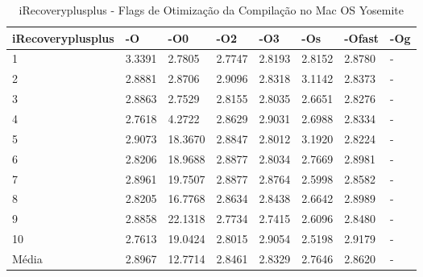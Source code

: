 \begin{table}[!ht]
\centering
\caption{iRecoveryplusplus - Flags de Otimização da Compilação no Mac OS Yosemite}
\label{tab:otimizacao_compilacao:mac:irecoveryplusplus}
\begin{tabular}{llllllll}
\textbf{iRecoveryplusplus} & \textbf{-O}  & \textbf{-O0}   & \textbf{-O2} & \textbf{-O3} & \textbf{-Os} & \textbf{-Ofast} & \textbf{-Og} \\ \toprule
1                          & 3.3391       &   2.7805       &  2.7747      &  2.8193      &  2.8152      &   2.8780        &  -           \\ 
2                          & 2.8881       &   2.8706       &  2.9096      &  2.8318      &  3.1142      &   2.8373        &  -           \\ 
3                          & 2.8863       &   2.7529       &  2.8155      &  2.8035      &  2.6651      &   2.8276        &  -           \\ 
4                          & 2.7618       &   4.2722       &  2.8629      &  2.9031      &  2.6988      &   2.8334        &  -           \\ 
5                          & 2.9073       &   18.3670      &  2.8847      &  2.8012      &  3.1920      &   2.8224        &  -           \\ 
6                          & 2.8206       &   18.9688      &  2.8877      &  2.8034      &  2.7669      &   2.8981        &  -           \\ 
7                          & 2.8961       &   19.7507      &  2.8877      &  2.8764      &  2.5998      &   2.8582        &  -           \\ 
8                          & 2.8205       &   16.7768      &  2.8634      &  2.8438      &  2.6642      &   2.8989        &  -           \\ 
9                          & 2.8858       &   22.1318      &  2.7734      &  2.7415      &  2.6096      &   2.8480        &  -           \\ 
10                         & 2.7613       &   19.0424      &  2.8015      &  2.9054      &  2.5198      &   2.9179        &  -           \\ \bottomrule
Média                      & 2.8967       &   12.7714      &  2.8461      &  2.8329      &  2.7646      &   2.8620        &  -           \\ 
\end{tabular}
\end{table}



